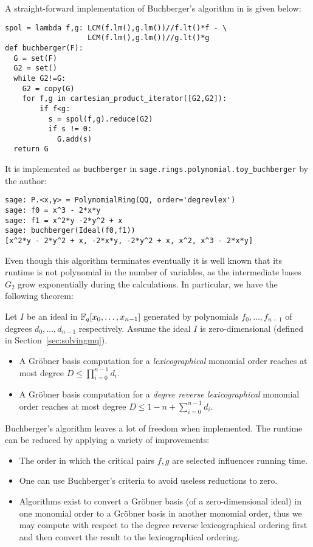 A straight-forward implementation of Buchberger's algorithm in \Sage is given below:

\begin{lstlisting}
spol = lambda f,g: LCM(f.lm(),g.lm())//f.lt()*f - \
                   LCM(f.lm(),g.lm())//g.lt()*g
def buchberger(F):
  G = set(F)
  G2 = set()
  while G2!=G:
    G2 = copy(G)
    for f,g in cartesian_product_iterator([G2,G2]):
        if f<g:
          s = spol(f,g).reduce(G2)
          if s != 0:
            G.add(s)
  return G
\end{lstlisting}

It is implemented as \verb|buchberger| in \verb|sage.rings.polynomial.toy_buchberger| by the author:

\begin{lstlisting}
sage: P.<x,y> = PolynomialRing(QQ, order='degrevlex')
sage: f0 = x^3 - 2*x*y                                       
sage: f1 = x^2*y -2*y^2 + x  
sage: buchberger(Ideal(f0,f1))
[x^2*y - 2*y^2 + x, -2*x*y, -2*y^2 + x, x^2, x^3 - 2*x*y]
\end{lstlisting}

Even though this algorithm terminates eventually it is well known \cite[p.511ff]{Becker1991} that its runtime is not polynomial in the number of variables, as the intermediate bases $G_2$ grow exponentially during the calculations. In particular, we have the following theorem:

\begin{theorem}
Let $I$ be an ideal in $\mathbb{F}_q[x_0,\dots,x_{n-1}]$ generated by polynomials $f_0,\dots,f_{n-1}$ of degrees $d_0,\dots,d_{n-1}$ respectively. Assume the ideal $I$ is zero-dimensional (defined in Section~\ref{sec:solvingmq}).
\begin{itemize}
 \item A Gröbner basis computation for a \emph{lexicographical} monomial order reaches at most degree $D \leq \prod_{i=0}^{n-1} d_i$.
 \item A Gröbner basis computation for a \emph{degree reverse lexicographical} monomial order reaches at most degree $D \leq 1 - n + \sum_{i=0}^{n-1} d_i$.
\end{itemize}
\end{theorem}

Buchberger's algorithm leaves a lot of freedom when implemented. The runtime can be reduced by applying a variety of improvements:
\begin{itemize}
\item The order in which the critical pairs $f,g$  are selected influences running time.
\item One can use Buchberger's criteria to avoid useless reductions to zero.
\item Algorithms exist \cite{fglm,Collart1997} to convert a Gröbner basis (of a zero-dimensional ideal) in one monomial order to a Gröbner basis in another monomial order, thus we may compute with respect to the degree reverse lexicographical ordering first and then convert the result to the lexicographical ordering.
\end{itemize}

